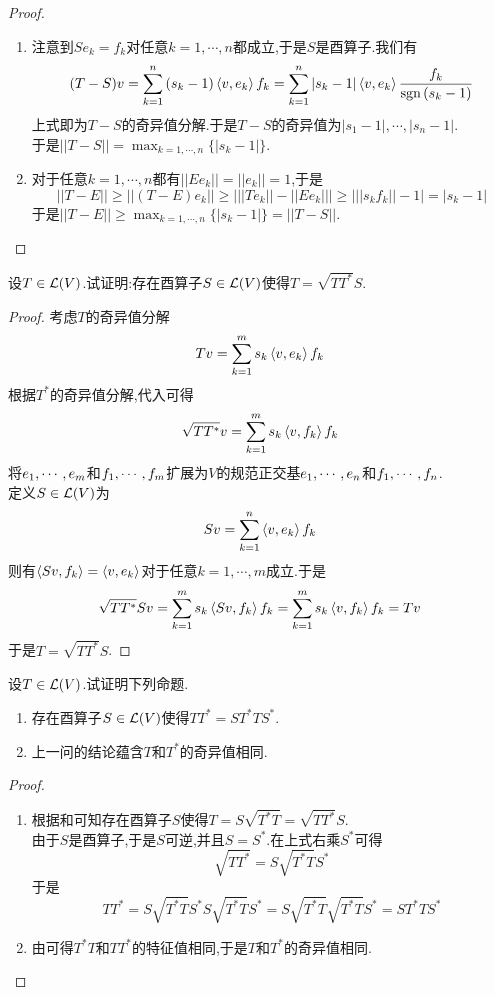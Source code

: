 \documentclass{ctexart}
\begin{document}
\begin{proof}
    \begin{enumerate}[label=\tbf{(\arabic*)}]
        \item 注意到$Se_k=f_k$对任意$k=1,\cdots,n$都成立,于是$S$是酉算子.我们有
            \[(T-S)v=\sum_{k=1}^{n}\left(s_k-1\right)\left\langle{v},{e_k}\right\rangle f_k=\sum_{k=1}^{n}\left|s_k-1\right|\left\langle{v},{e_k}\right\rangle\dfrac{f_k}{\text{sgn}\left(s_k-1\right)}\]
            上式即为$T-S$的奇异值分解.于是$T-S$的奇异值为$\left|s_1-1\right|,\cdots,\left|s_n-1\right|$.\\
            于是$||T-S||=\displaystyle\max_{k=1,\cdots,n}\{|s_k-1|\}$.
        \item 对于任意$k=1,\cdots,n$都有$||Ee_k||=||e_k||=1$,于是
            \[||T-E||\geqslant||(T-E)e_k||\geqslant\left|||Te_k||-||Ee_k||\right|\geqslant\left|||s_kf_k||-1\right|=\left|s_k-1\right|\]
            于是$||T-E||\geqslant\displaystyle\max_{k=1,\cdots,n}\{|s_k-1|\}=||T-S||$.
    \end{enumerate}
\end{proof}
\begin{problem}[28.]
    设$T\in\mathcal{L}(V)$.试证明:存在酉算子$S\in\mathcal{L}(V)$使得$T=\sqrt{TT^*}S$.
\end{problem}
\begin{proof}
    考虑$T$的奇异值分解
    \[Tv=\sum_{k=1}^{m}s_k\left\langle{v},{e_k}\right\rangle f_k\]
    根据$T^*$的奇异值分解,代入可得
    \[\sqrt{TT^*}v=\sum_{k=1}^{m}s_k\left\langle{v},{f_k}\right\rangle f_k\]
    将${e}_1,\cdots,{e}_{m}$和${f}_1,\cdots,{f}_{m}$扩展为$V$的规范正交基${e}_1,\cdots,{e}_{n}$和${f}_1,\cdots,{f}_{n}$.\\
    定义$S\in\mathcal{L}(V)$为
    \[Sv=\sum_{k=1}^{n}\left\langle{v},{e_k}\right\rangle f_k\]
    则有$\left\langle{Sv},{f_k}\right\rangle=\left\langle{v},{e_k}\right\rangle$对于任意$k=1,\cdots,m$成立.于是
    \[\sqrt{TT^*}Sv=\sum_{k=1}^{m}s_k\left\langle{Sv},{f_k}\right\rangle f_k=\sum_{k=1}^{m}s_k\left\langle{v},{f_k}\right\rangle f_k=Tv\]
    于是$T=\sqrt{TT^*}S$.
\end{proof}
\begin{problem}[29.]
    设$T\in\mathcal{L}(V)$.试证明下列命题.
    \begin{enumerate}[label=\tbf{(\arabic*)}]
        \item 存在酉算子$S\in\mathcal{L}(V)$使得$TT^*=ST^*TS^*$.
        \item 上一问的结论蕴含$T$和$T^*$的奇异值相同.
    \end{enumerate}
\end{problem}
\begin{proof}
    \begin{enumerate}[label=\tbf{(\arabic*)}]
        \item 根据和可知存在酉算子$S$使得$T=S\sqrt{T^*T}=\sqrt{TT^*}S$.\\
            由于$S$是酉算子,于是$S$可逆,并且$S=S^*$.在上式右乘$S^*$可得
            \[\sqrt{TT^*}=S\sqrt{T^*T}S^*\]
            于是
            \[TT^*=S\sqrt{T^*T}S^*S\sqrt{T^*T}S^*=S\sqrt{T^*T}\sqrt{T^*T}S^*=ST^*TS^*\]
        \item 由可得$T^*T$和$TT^*$的特征值相同,于是$T$和$T^*$的奇异值相同.
    \end{enumerate}
\end{proof}
\end{document}

